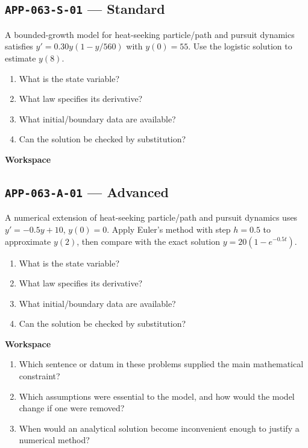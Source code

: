 \documentclass[11pt]{book}
\newcommand{\pid}[1]{\texttt{#1}}
\newcommand{\workspace}{\par\vspace{0.7in}\hrulefill\par\vspace{0.55in}\hrulefill\par}
\begin{document}
\subsection*{\pid{APP-063-S-01} — Standard}
\begin{problembox}
A bounded-growth model for heat-seeking particle/path and pursuit dynamics satisfies $y'=0.30y(1-y/560)$ with $y(0)=55$. Use the logistic solution to estimate $y(8)$.
\end{problembox}
\begin{promptbox}\begin{enumerate}
\item What is the state variable?
\item What law specifies its derivative?
\item What initial/boundary data are available?
\item Can the solution be checked by substitution?
\end{enumerate}\end{promptbox}
\textbf{Workspace}\workspace
{}
\subsection*{\pid{APP-063-A-01} — Advanced}
\begin{problembox}
A numerical extension of heat-seeking particle/path and pursuit dynamics uses $y'=-0.5y+10$, $y(0)=0$. Apply Euler's method with step $h=0.5$ to approximate $y(2)$, then compare with the exact solution $y=20(1-e^{-0.5t})$.
\end{problembox}
\begin{promptbox}\begin{enumerate}
\item What is the state variable?
\item What law specifies its derivative?
\item What initial/boundary data are available?
\item Can the solution be checked by substitution?
\end{enumerate}\end{promptbox}
\textbf{Workspace}\workspace
\begin{reflectionbox}\begin{enumerate}
\item Which sentence or datum in these problems supplied the main mathematical constraint?
\item Which assumptions were essential to the model, and how would the model change if one were removed?
\item When would an analytical solution become inconvenient enough to justify a numerical method?
\end{enumerate}\end{reflectionbox}
\end{document}
